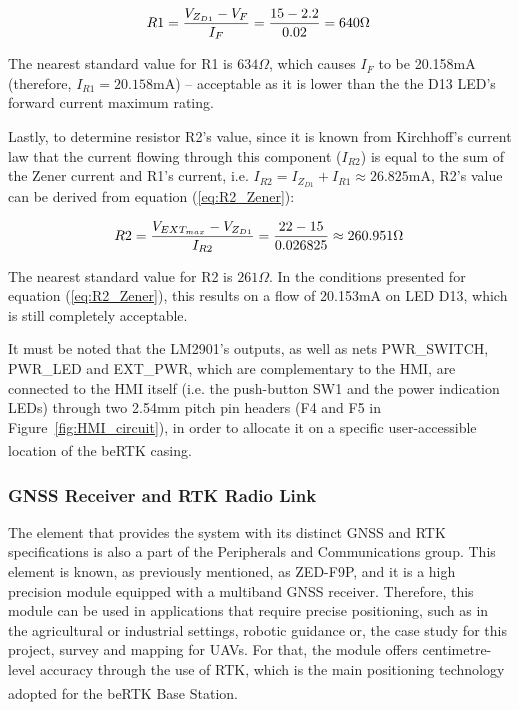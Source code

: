 \begin{equation}\label{eq:R1_Zener}
	R1=\frac{V_{Z_{D1}} - V_F}{I_F}=\frac{15 - 2.2}{0.02}=640\Omega \,\medskip
\end{equation}

The nearest standard value for R1 is $634 \Omega$, which causes $I_F$ to be 20.158mA (therefore, $I_{R1}=20.158$mA) -- acceptable as it is lower than the the D13 LED's forward current maximum rating.

Lastly, to determine resistor R2's value, since it is known from Kirchhoff's current law that the current flowing through this component ($I_{R2}$) is equal to the sum of the Zener current and R1's current, i.e. $I_{R2}=I_{Z_{D1}}+I_{R1} \approx 26.825$mA, R2's value can be derived from equation (\ref{eq:R2_Zener}):

\begin{equation}\label{eq:R2_Zener}
	R2 = \frac{V_{EXT_{max}} - V_{Z_{D1}}}{I_{R2}} = \frac{22 - 15}{0.026825} \approx 260.951 \Omega \,\medskip
\end{equation}

The nearest standard value for R2 is $261 \Omega$. In the conditions presented for equation (\ref{eq:R2_Zener}), this results on a flow of 20.153mA on LED D13, which is still completely acceptable.

It must be noted that the LM2901's outputs, as well as nets PWR\_SWITCH, PWR\_LED and EXT\_PWR, which are complementary to the HMI, are connected to the HMI itself (i.e. the push-button SW1 and the power indication LEDs) through two 2.54mm pitch pin headers (F4 and F5 in Figure~\ref{fig:HMI_circuit}), in order to allocate it on a specific user-accessible location of the beRTK\textsuperscript{\textregistered} casing.


\subsubsection{GNSS Receiver and RTK Radio Link}\label{sec:3232_ZEDF9P}

The element that provides the system with its distinct GNSS and RTK specifications is also a part of the Peripherals and Communications group. This element is known, as previously mentioned, as ZED-F9P, and it is a high precision module equipped with a multiband GNSS receiver. Therefore, this module can be used in applications that require precise positioning, such as in the agricultural or industrial settings, robotic guidance or, the case study for this project, survey and mapping for UAVs. For that, the module offers centimetre-level accuracy through the use of RTK, which is the main positioning technology adopted for the beRTK\textsuperscript{\textregistered} Base Station.

